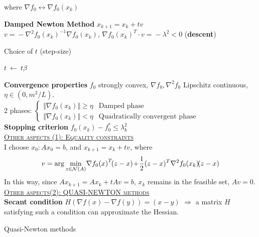 \documentclass[a4paper]{article}
\begin{document}
\begin{multicols}{2}
\begin{multicols}{2}
     where $\nabla{f_0} \leftrightarrow \nabla{f_0(x_k)}$
    \end{multicols}
    \noindent
     \textbf{Damped Newton Method}  $x_{k+1}=x_k+tv$\\
     $v\!=\!-\nabla^2{f_0(x_k)}^{-1}\nabla{f_0(x_k)}$,\! $\nabla{f_0(x_k)}^T\cdot{v}\!=\!\!-\!\lambda^2\!<\!0$ \!(\textbf{descent})
     \vspace{0.05cm}
     \begin{algorithm}[H]
        \caption{Choice of $t$ (step-size) }
        \begin{algorithmic}[1]
            \State{$\alpha \in (0,\frac{1}{2}], \ \beta \in (0,1), t=1$}
                {$t \ \gets \ t \beta$}
            \EndWhile
        \end{algorithmic}
     \end{algorithm}
     \vspace{-0.5cm}
     \noindent
     \textbf{Convergence properties} $f_0$ strongly convex, $\nabla{f_0}, \nabla^2{f_0}$ Lipschitz continuous, $\eta \in (0, m^2/L)$. \\
     2 phases:
     $\begin{cases}
        \Vert \nabla{f_0(x_k)} \Vert \ge \eta&\text{Damped phase}\\
        \Vert \nabla{f_0(x_k)} \Vert < \eta&\text{Quadratically convergent phase}
     \end{cases}$\\
     \textbf{Stopping criterion} $f_0(x_k) - f_0^* \le \lambda_k^2$\\
     \textsc{\underline{Other aspects (1): Equality constraints}}\\
     I choose $x_0: Ax_0=b$, and $x_{k+1}=x_k+tv$, where
     \vspace{-0.2cm}
     \begin{equation*}
        \small
        v=\arg\min_{z\in\mathcal{N}(A)} {\!\nabla{f_0(x)}^T\!(z-x)\!+\!\frac{1}{2}(z-x)^T\nabla^2{f_0(x_k)}\!(z-x)}
     \end{equation*}
     In this way, since $A{x_{k+1}}=A{x_{k}}+tAv=b$, $x_k$ remains in the feasible set, $Av=0$.\\
     \noindent
     \textsc{\underline{Other aspects(2): QUASI-NEWTON methods}} \\
     \textbf{Secant condition} $H(\nabla{f(x)}-\nabla{f(y)})=(x-y)$ $\Rightarrow$ a matrix $H$ satisfying such a condition can approximate the Hessian.

     \begin{algorithm}[H]
        \caption{Quasi-Newton methods}
        \begin{algorithmic}[1]

        \end{algorithmic}
     \end{algorithm}
     
\end{multicols}
\end{document}
